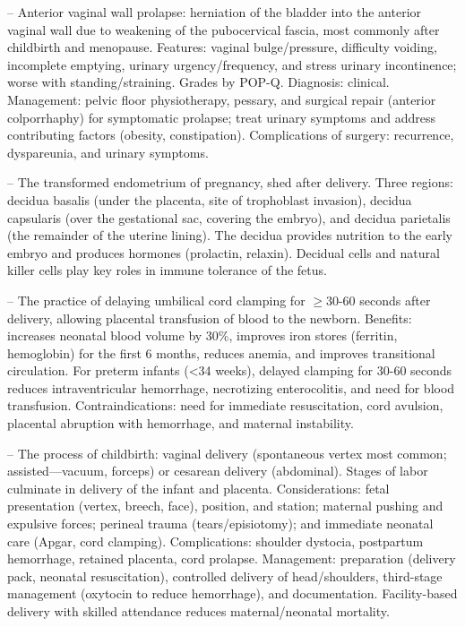 -- Anterior vaginal wall prolapse: herniation of the bladder into the anterior vaginal wall due to weakening of the pubocervical fascia, most commonly after childbirth and menopause. Features: vaginal bulge/pressure, difficulty voiding, incomplete emptying, urinary urgency/frequency, and stress urinary incontinence; worse with standing/straining. Grades by POP-Q. Diagnosis: clinical. Management: pelvic floor physiotherapy, pessary, and surgical repair (anterior colporrhaphy) for symptomatic prolapse; treat urinary symptoms and address contributing factors (obesity, constipation). Complications of surgery: recurrence, dyspareunia, and urinary symptoms.

-- The transformed endometrium of pregnancy, shed after delivery. Three regions: decidua basalis (under the placenta, site of trophoblast invasion), decidua capsularis (over the gestational sac, covering the embryo), and decidua parietalis (the remainder of the uterine lining). The decidua provides nutrition to the early embryo and produces hormones (prolactin, relaxin). Decidual cells and natural killer cells play key roles in immune tolerance of the fetus.


-- The practice of delaying umbilical cord clamping for \(\ge\)30-60 seconds after delivery, allowing placental transfusion of blood to the newborn. Benefits: increases neonatal blood volume by 30\%, improves iron stores (ferritin, hemoglobin) for the first 6 months, reduces anemia, and improves transitional circulation. For preterm infants (<34 weeks), delayed clamping for 30-60 seconds reduces intraventricular hemorrhage, necrotizing enterocolitis, and need for blood transfusion. Contraindications: need for immediate resuscitation, cord avulsion, placental abruption with hemorrhage, and maternal instability.

-- The process of childbirth: vaginal delivery (spontaneous vertex most common; assisted—vacuum, forceps) or cesarean delivery (abdominal). Stages of labor culminate in delivery of the infant and placenta. Considerations: fetal presentation (vertex, breech, face), position, and station; maternal pushing and expulsive forces; perineal trauma (tears/episiotomy); and immediate neonatal care (Apgar, cord clamping). Complications: shoulder dystocia, postpartum hemorrhage, retained placenta, cord prolapse. Management: preparation (delivery pack, neonatal resuscitation), controlled delivery of head/shoulders, third-stage management (oxytocin to reduce hemorrhage), and documentation. Facility-based delivery with skilled attendance reduces maternal/neonatal mortality.

